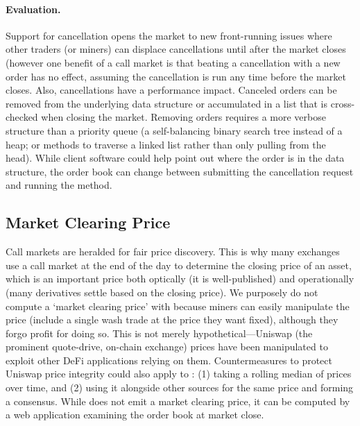 \paragraph{Evaluation.} Support for cancellation opens the market to new front-running issues where other traders (or miners) can displace cancellations until after the market closes (however one benefit of a call market is that beating a cancellation with a new order has no effect, assuming the cancellation is run any time before the market closes. Also, cancellations have a performance impact. Canceled orders can be removed from the underlying data structure or accumulated in a list that is cross-checked when closing the market. Removing orders requires a more verbose structure than a priority queue (\eg a self-balancing binary search tree instead of a heap; or methods to traverse a linked list rather than only pulling from the head). While client software could help point out where the order is in the data structure, the order book can change between submitting the cancellation request and running the method. %


\subsection{Market Clearing Price}

Call markets are heralded for fair price discovery. This is why many exchanges use a call market at the end of the day to determine the closing price of an asset, which is an important price both optically (it is well-published) and operationally (many derivatives settle based on the closing price). We purposely do not compute a `market clearing price' with \cm because miners can easily manipulate the price (\ie include a single wash trade at the price they want fixed), although they forgo profit for doing so. This is not merely hypothetical---Uniswap (the prominent quote-drive, on-chain exchange) prices have been manipulated to exploit other DeFi applications relying on them. Countermeasures to protect Uniswap price integrity could also apply to \cm: (1) taking a rolling median of prices over time, and (2) using it alongside other sources for the same price and forming a consensus. While \cm does not emit a market clearing price, it can be computed by a web application examining the order book at market close. 

